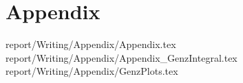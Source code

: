 \documentclass{article}
\begin{document}
\onecolumn
\section*{Appendix}
{report/Writing/Appendix/Appendix.tex}
{report/Writing/Appendix/Appendix_GenzIntegral.tex}
{report/Writing/Appendix/GenzPlots.tex}



\end{document}
